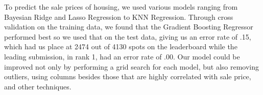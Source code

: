 \documentclass[fleqn,10pt]{SelfArx} %
\begin{document}
To predict the sale prices of housing, we used various models ranging from Bayesian Ridge and Lasso Regression to KNN Regression. Through cross validation on the training data, we found that the Gradient Boosting Regressor performed best so we used that on the test data, giving us an error rate of .15, which had us place at 2474 out of 4130 spots on the leaderboard while the leading submission, in rank 1, had an error rate of .00. Our model could be improved not only by performing a grid search for each model, but also removing outliers, using columns besides those that are highly correlated with sale price, and other techniques. 

\bigskip
\bigskip
\bigskip    








\end{document}
